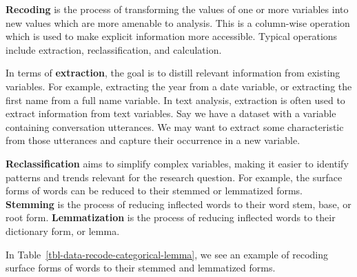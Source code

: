 \documentclass[
  letterpaper,
  krantz1]{latex/krantz-mod}
\theoremstyle{definition}
\theoremstyle{definition}
\theoremstyle{remark}
\begin{document}
\textbf{Recoding} is the process of
transforming the values of one or more variables into new values which
are more amenable to analysis. This is a column-wise operation which is
used to make explicit information more accessible. Typical operations
include extraction,
reclassification, and
calculation.

In terms of \textbf{extraction}, the goal is
to distill relevant information from existing variables. For example,
extracting the year from a date variable, or extracting the first name
from a full name variable. In text analysis, extraction is often used to
extract information from text variables. Say we have a dataset with a
variable containing conversation utterances. We may want to extract some
characteristic from those utterances and capture their occurrence in a
new variable.

\textbf{Reclassification} aims to
simplify complex variables, making it easier to identify patterns and
trends relevant for the research question. For example, the surface
forms of words can be reduced to their stemmed or
lemmatized forms. \textbf{Stemming} is the process
of reducing inflected words to their word stem, base, or root form.
\textbf{Lemmatization} is the process of reducing
inflected words to their dictionary form, or lemma.

In Table~\ref{tbl-data-recode-categorical-lemma}, we see an example of
recoding surface forms of words to their stemmed and lemmatized forms.
\end{document}
